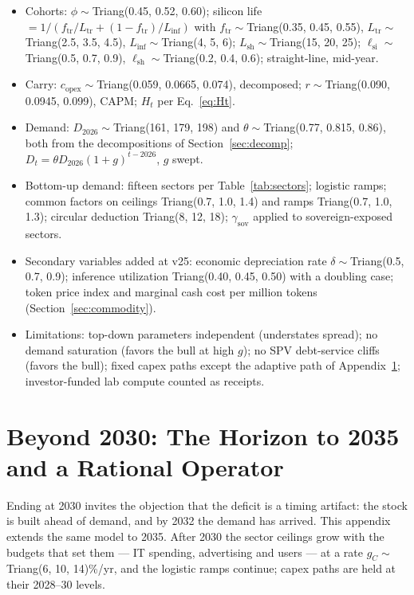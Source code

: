 \documentclass[11pt,letterpaper]{article}
\begin{document}
\begin{itemize}
    The adaptive path is what a rational operator would do with the same information the model has. Non-AI baseline $N_c=(161-A_{2023})(1+g_N)^{c-2023}$, $A_{2023}\sim$Triang(20, 30, 40), $g_N\sim$Triang(0.02, 0.06, 0.10). Grid energization cap Triang(1150, 1400, 1680) \$B/yr; siting deferral $f_{\text{delay}}\sim$Triang(0.10, 0.20, 0.35) from 2026; deferred capex carries $r$ only. Shell cost uplift $\kappa_{\text{site}}\sim$Triang(1.02, 1.05, 1.09); opex uplift $u\sim$Triang(0, 0.03, 0.06).
    \item Cohorts: $\phi\sim$Triang(0.45, 0.52, 0.60); silicon life $=1/(f_{\text{tr}}/L_{\text{tr}}+(1-f_{\text{tr}})/L_{\text{inf}})$ with $f_{\text{tr}}\sim$Triang(0.35, 0.45, 0.55), $L_{\text{tr}}\sim$Triang(2.5, 3.5, 4.5), $L_{\text{inf}}\sim$Triang(4, 5, 6); $L_{\text{sh}}\sim$Triang(15, 20, 25); $\ell_{\text{si}}\sim$Triang(0.5, 0.7, 0.9), $\ell_{\text{sh}}\sim$Triang(0.2, 0.4, 0.6); straight-line, mid-year.
    \item Carry: $c_{\text{opex}}\sim$Triang(0.059, 0.0665, 0.074), decomposed; $r\sim$Triang(0.090, 0.0945, 0.099), CAPM; $H_t$ per Eq.~\ref{eq:Ht}.
    \item Demand: $D_{2026}\sim$Triang(161, 179, 198) and $\theta\sim$Triang(0.77, 0.815, 0.86), both from the decompositions of Section~\ref{sec:decomp}; $D_t=\theta D_{2026}(1+g)^{t-2026}$, $g$ swept.
    \item Bottom-up demand: fifteen sectors per Table~\ref{tab:sectors}; logistic ramps; common factors on ceilings Triang(0.7, 1.0, 1.4) and ramps Triang(0.7, 1.0, 1.3); circular deduction Triang(8, 12, 18); $\gamma_{\text{sov}}$ applied to sovereign-exposed sectors.
    \item Secondary variables added at v25: economic depreciation rate $\delta\sim$Triang(0.5, 0.7, 0.9); inference utilization Triang(0.40, 0.45, 0.50) with a doubling case; token price index and marginal cash cost per million tokens (Section~\ref{sec:commodity}).
    \item Limitations: top-down parameters independent (understates spread); no demand saturation (favors the bull at high $g$); no SPV debt-service cliffs (favors the bull); fixed capex paths except the adaptive path of Appendix~\ref{app:horizon}; investor-funded lab compute counted as receipts.
\end{itemize}


\section{Beyond 2030: The Horizon to 2035 and a Rational Operator}\label{app:horizon}
Ending at 2030 invites the objection that the deficit is a timing artifact: the stock is built ahead of demand, and by 2032 the demand has arrived. This appendix extends the same model to 2035. After 2030 the sector ceilings grow with the budgets that set them --- IT spending, advertising and users --- at a rate $g_C\sim$Triang(6, 10, 14)\%/yr, and the logistic ramps continue; capex paths are held at their 2028--30 levels.
\end{document}

